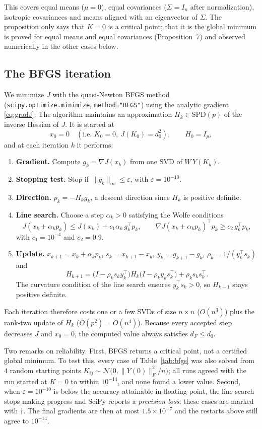 This covers equal means ($\mu=0$), equal covariances ($\Sigma=I_n$ after normalization),
isotropic covariances and means aligned with an eigenvector of $\Sigma$.
The proposition only says that $K=0$ is a critical point; that it is the global minimum is proved for
equal means and equal covariances (Proposition~7) and observed numerically in the other cases below.

\subsection{The BFGS iteration}

We minimize $J$ with the quasi-Newton BFGS method
(\texttt{scipy.optimize.minimize}, \texttt{method="BFGS"}) using the analytic gradient \eqref{eq:gradJ}.
The algorithm maintains an approximation $H_k\in\mathrm{SPD}(p)$ of the inverse Hessian of $J$.
It is started at
\[
x_0=0\quad(\text{i.e. }K_0=0,\ J(K_0)=d_0^2),\qquad H_0=I_p,
\]
and at each iteration $k$ it performs:
\begin{enumerate}
\item \textbf{Gradient.} Compute $g_k=\nabla J(x_k)$ from one SVD of $W\,Y(K_k)$.
\item \textbf{Stopping test.} Stop if $\|g_k\|_\infty\le\varepsilon$, with $\varepsilon=10^{-10}$.
\item \textbf{Direction.} $p_k=-H_kg_k$, a descent direction since $H_k$ is positive definite.
\item \textbf{Line search.} Choose a step $\alpha_k>0$ satisfying the Wolfe conditions
\[
J(x_k+\alpha_kp_k)\le J(x_k)+c_1\alpha_k\,g_k^\top p_k,\qquad
\nabla J(x_k+\alpha_kp_k)^\top p_k\ge c_2\,g_k^\top p_k,
\]
with $c_1=10^{-4}$ and $c_2=0.9$.
\item \textbf{Update.} $x_{k+1}=x_k+\alpha_kp_k$, $s_k=x_{k+1}-x_k$, $y_k=g_{k+1}-g_k$, $\rho_k=1/(y_k^\top s_k)$ and
\[
H_{k+1}=\big(I-\rho_ks_ky_k^\top\big)H_k\big(I-\rho_ky_ks_k^\top\big)+\rho_ks_ks_k^\top .
\]
The curvature condition of the line search ensures $y_k^\top s_k>0$, so $H_{k+1}$ stays positive definite.
\end{enumerate}
Each iteration therefore costs one or a few SVDs of size $n\times n$ ($O(n^3)$) plus the rank-two update
of $H_k$ ($O(p^2)=O(n^4)$).
Because every accepted step decreases $J$ and $x_0=0$, the computed value always satisfies $d_F\le d_0$.

Two remarks on reliability.
First, BFGS returns a critical point, not a certified global minimum.
To test this, every case of Table~\ref{tab:bfgs} was also solved from $4$ random starting points
$K_{ij}\sim\mathcal N\big(0,\|Y(0)\|_F^2/n\big)$; all runs agreed with the run started at $K=0$ to within
$10^{-14}$, and none found a lower value.
Second, when $\varepsilon=10^{-10}$ is below the accuracy attainable in floating point, the line search
stops making progress and SciPy reports a \emph{precision loss}; these cases are marked with $\dagger$.
The final gradients are then at most $1.5\times10^{-7}$ and the restarts above still agree to $10^{-14}$.

